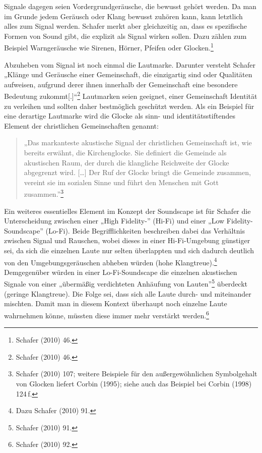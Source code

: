 \documentclass[a4paper,
fontsize=11pt,
oneside,
numbers=noperiodatend,
parskip=half-,
bibliography=totoc,
final
]{scrartcl}
\begin{document}
Signale dagegen seien Vordergrundgeräusche, die bewusst gehört werden.
Da man im Grunde jedem Geräusch oder Klang bewusst zuhören kann, kann
letztlich alles zum Signal werden. Schafer merkt aber gleichzeitig an,
dass es spezifische Formen von Sound gibt, die explizit als Signal
wirken sollen. Dazu zählen zum Beispiel Warngeräusche wie Sirenen,
Hörner, Pfeifen oder Glocken.\footnote{Schafer (2010) 46.}

Abzuheben vom Signal ist noch einmal die Lautmarke. Darunter versteht
Schafer „Klänge und Geräusche einer Gemeinschaft, die einzigartig sind
oder Qualitäten aufweisen, aufgrund derer ihnen innerhalb der
Gemeinschaft eine besondere Bedeutung zukommt{[}.{]}``\footnote{Schafer
  (2010) 46.} Lautmarken seien geeignet, einer Gemeinschaft Identität zu
verleihen und sollten daher bestmöglich geschützt werden. Als ein
Beispiel für eine derartige Lautmarke wird die Glocke als sinn- und
identitätsstiftendes Element der christlichen Gemeinschaften genannt:

\begin{quote}
„Das markanteste akustische Signal der christlichen Gemeinschaft ist,
wie bereits erwähnt, die Kirchenglocke. Sie definiert die Gemeinde als
akustischen Raum, der durch die klangliche Reichweite der Glocke
abgegrenzt wird. {[}\ldots{]} Der Ruf der Glocke bringt die Gemeinde
zusammen, vereint sie im sozialen Sinne und führt den Menschen mit Gott
zusammen.''\footnote{Schafer (2010) 107; weitere Beispiele für den
  außergewöhnlichen Symbolgehalt von Glocken liefert Corbin (1995);
  siehe auch das Beispiel bei Corbin (1998) 124\,f.}
\end{quote}

Ein weiteres essentielles Element im Konzept der Soundscape ist für
Schafer die Unterscheidung zwischen einer „High Fidelity-'' (Hi-Fi) und
einer „Low Fidelity-Soundscape'' (Lo-Fi). Beide Begrifflichkeiten
beschreiben dabei das Verhältnis zwischen Signal und Rauschen, wobei
dieses in einer Hi-Fi-Umgebung günstiger sei, da sich die einzelnen
Laute nur selten überlappten und sich dadurch deutlich von den
Umgebungsgeräuschen abheben würden (hohe Klangtreue).\footnote{Dazu
  Schafer (2010) 91.} Demgegenüber würden in einer Lo-Fi-Soundscape die
einzelnen akustischen Signale von einer „übermäßig verdichteten
Anhäufung von Lauten''\footnote{Schafer (2010) 91.} überdeckt (geringe
Klangtreue). Die Folge sei, dass sich alle Laute durch- und miteinander
mischten. Damit man in diesem Kontext überhaupt noch einzelne Laute
wahrnehmen könne, müssten diese immer mehr verstärkt werden.\footnote{Schafer
  (2010) 92.}
\end{document}
